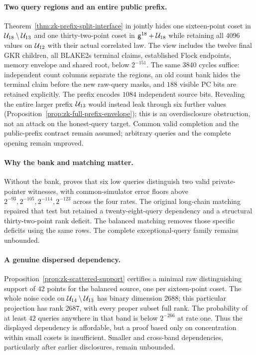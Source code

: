 \paragraph{Two query regions and an entire public prefix.} Theorem~\ref{thm:zk-prefix-split-interface} in  jointly hides one sixteen-point coset in $\mathcal{U}_{18}\setminus\mathcal{U}_{13}$ and one thirty-two-point coset in $\mathsf{g}^{18}+\mathcal{U}_{18}$ while retaining all $4096$ values on $\mathcal{U}_{12}$ with their actual correlated law. The view includes the twelve final GKR children, all BLAKE2s terminal claims, established Flock endpoints, memory envelope and shared root, below $2^{-151}$. The same $3840$ cycles suffice: independent count columns separate the regions, an old count bank hides the terminal claim before the new raw-query masks, and $188$ visible PC bits are retained explicitly. The prefix encodes $1084$ independent source bits. Revealing the entire larger prefix $\mathcal{U}_{13}$ would instead leak through six further values (Proposition~\ref{prop:zk-full-prefix-envelope}); this is an overdisclosure obstruction, not an attack on the honest-query target. Common valid completion and the public-prefix contract remain assumed; arbitrary queries and the complete opening remain unproved.

\paragraph{Why the bank and matching matter.} Without the bank,  proves that six low queries distinguish two valid private-pointer witnesses, with common-simulator error floors above $2^{-93},2^{-105},2^{-114},2^{-123}$ across the four rates. The original long-chain matching repaired that test but retained a twenty-eight-query dependency and a structural thirty-two-point rank deficit. The balanced matching removes those specific deficits using the same rows. The complete exceptional-query family remains unbounded.

\paragraph{A genuine dispersed dependency.} Proposition~\ref{prop:zk-scattered-support} certifies a minimal raw distinguishing support of $42$ points for the balanced source, one per sixteen-point coset. The whole noise code on $\mathcal{U}_{14}\setminus\mathcal{U}_{13}$ has binary dimension $2688$; this particular projection has rank $2687$, with every proper subset full rank. The probability of at least $42$ queries anywhere in that band is below $2^{-266}$ at rate one. Thus the displayed dependency is affordable, but a proof based only on concentration within small cosets is insufficient. Smaller and cross-band dependencies, particularly after earlier disclosures, remain unbounded.

